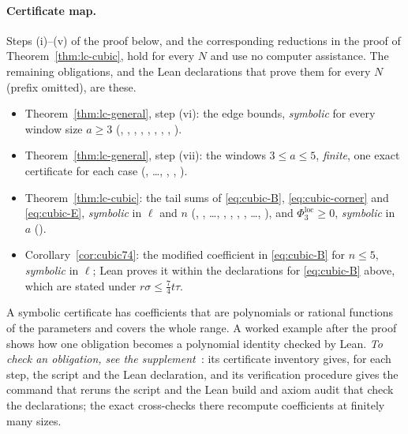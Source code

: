 \paragraph{Certificate map.}
Steps (i)--(v) of the proof below, and the corresponding reductions in the proof of Theorem~\ref{thm:lc-cubic}, hold for every $N$ and use no computer assistance. The remaining obligations, and the Lean declarations that prove them for every $N$ (prefix  omitted), are these.
\begin{itemize}
\item Theorem~\ref{thm:lc-general}, step (vi): the edge bounds, \emph{symbolic} for every window size $a\geq3$ (, , , , , , , , ).
\item Theorem~\ref{thm:lc-general}, step (vii): the windows $3\leq a\leq5$, \emph{finite}, one exact certificate for each case (, \dots, , , ).
\item Theorem~\ref{thm:lc-cubic}: the tail sums of \eqref{eq:cubic-B}, \eqref{eq:cubic-corner} and \eqref{eq:cubic-E}, \emph{symbolic} in $\ell$ and $n$ (, , \dots, , , , , \dots, ), and $\Phi^{\mathrm{loc}}_3\geq0$, \emph{symbolic} in $a$ ().
\item Corollary~\ref{cor:cubic74}: the modified coefficient in \eqref{eq:cubic-B} for $n\leq5$, \emph{symbolic} in $\ell$; Lean proves it within the declarations for \eqref{eq:cubic-B} above, which are stated under $r\sigma\leq\frac74t\tau$.
\end{itemize}
A symbolic certificate has coefficients that are polynomials or rational functions of the parameters and covers the whole range. A worked example after the proof shows how one obligation becomes a polynomial identity checked by Lean. \emph{To check an obligation, see the supplement~\cite{suppB}}: its certificate inventory gives, for each step, the script and the Lean declaration, and its verification procedure gives the command that reruns the script and the Lean build and axiom audit that check the declarations; the exact cross-checks there recompute coefficients at finitely many sizes.
